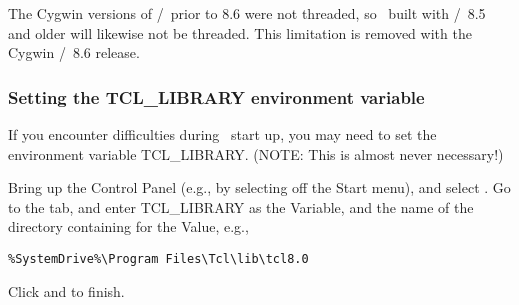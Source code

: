 The Cygwin versions of \Tcl/\Tk\ prior to 8.6 were not threaded, so
\OOMMF\ built with \Tcl/\Tk\ 8.5 and older will likewise not be
threaded.  This limitation is removed with the Cygwin \Tcl/\Tk\ 8.6
release.

\subsubsection{Setting the TCL\_LIBRARY environment variable}

If you encounter difficulties during \OOMMF\ start up, you may need to set
the environment variable
TCL\_LIBRARY.  (NOTE: This
is almost never necessary!)

Bring up the Control Panel (e.g., by selecting
 off the Start menu), and select
.  Go to the  tab, and enter
TCL\_LIBRARY as the Variable, and the name of the directory containing
 for the Value, e.g.,
\begin{verbatim}
%SystemDrive%\Program Files\Tcl\lib\tcl8.0
\end{verbatim}
Click  and  to finish.



